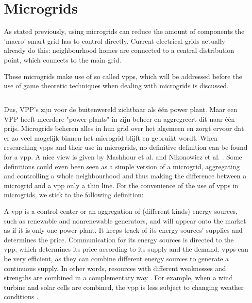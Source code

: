 \section{Microgrids}
As stated previously, using microgrids can reduce the amount of components the 'macro' smart grid has to control directly. Current electrical grids actually already do this: neighbourhood homes are connected to a central distribution point, which connects to the main grid.

These microgrids make use of so called \glspl{vpp}, which will be addressed before the use of game theoretic techniques when dealing with microgrids is discussed.

\subsection{}
Dus, VPP's zijn voor de buitenwereld zichtbaar als één power plant. Maar een VPP heeft meerdere "power plants" in zijn beheer en aggregreert dit naar één prijs. Microgrids beheren alles in hun grid over het algemeen en zorgt ervoor dat er zo veel mogelijk binnen het microgrid blijft en gebruikt wordt.
When researching \glspl{vpp} and their use in microgrids, no definitive definition can be found for a \gls{vpp}. A nice view is given by Mashhour et al. \cite{MashhourMoghaddas-Tafreshi2011} and Nikonowicz et al. \cite{NikonowiczMilewski2012}. Some definitions could even been seen as a simple version of a microgrid, aggregating and controlling a whole neighbourhood \cite{Kumagai2012} and thus making the difference between a microgrid and a \gls{vpp} only a thin line. For the convenience of the use of \glspl{vpp} in microgrids, we stick to the following definition:

A \gls{vpp} is a control center or an aggregation of (different kinds) energy sources, such as renewable and nonrenewable generators, and will appear onto the market as if it is only one power plant. It keeps track of its energy sources' supplies and determines the price. Communication for its energy sources is directed to the \gls{vpp}, which determines its price according to its supply and the demand. \glspl{vpp} can be very efficient, as they can combine different energy sources to generate a continuous supply. In other words, resources with different weaknesses and strengths are combined in a complementary way \cite{Koeppel2003}. For example, when a wind turbine and solar cells are combined, the \gls{vpp} is less subject to changing weather conditions \cite{Tromly2001, Kumagai2012, MashhourMoghaddas-Tafreshi2011, NikonowiczMilewski2012}. 

